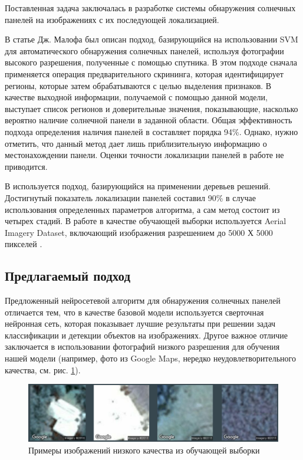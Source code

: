 Поставленная задача заключалась в разработке системы обнаружения солнечных панелей на изображениях с их последующей локализацией.

В статье Дж. Малофа \cite{malof2015} был описан подход, базирующийся на использовании SVM для автоматического обнаружения солнечных панелей, используя фотографии высокого разрешения, полученные с помощью спутника. В этом подходе сначала применяется операция предварительного скрининга, которая идентифицирует регионы, которые затем обрабатываются с целью выделения признаков. В качестве выходной информации, получаемой с помощью данной модели, выступает список регионов и доверительные значения, показывающие, насколько вероятно наличие солнечной панели в заданной области. Общая эффективность подхода определения наличия панелей в \cite{malof2015} составляет порядка 94\%. Однако, нужно отметить, что данный метод дает лишь приблизительную информацию о местонахождении панели. Оценки точности локализации панелей в работе не приводится.

В \cite{malof2016} используется подход, базирующийся на применении деревьев решений. Достигнутый показатель локализации панелей составил 90\% в случае использования определенных параметров алгоритма, а сам метод состоит из четырех стадий. В работе в качестве обучающей выборки используется Aerial Imagery Dataset, включающий изображения разрешением до 5000 Х 5000 пикселей \cite{bradbury2016}.

\subsection{Предлагаемый подход}

Предложенный нейросетевой алгоритм для обнаружения солнечных панелей отличается тем, что в качестве базовой модели используется сверточная нейронная сеть, которая показывает лучшие результаты при решении задач классификации и детекции объектов на изображениях. Другое важное отличие заключается в использовании фотографий низкого разрешения для обучения нашей модели (например, фото из Google Maps, нередко неудовлетворительного качества, см. рис. \ref{fig:example_of_images}). 

\begin{figure}[ht]
	\centering
	\includegraphics[width=16cm]{man-source/images/ch4/pic4-16.png}
	\caption{Примеры изображений низкого качества из обучающей выборки}
	\label{fig:example_of_images}
\end{figure}

